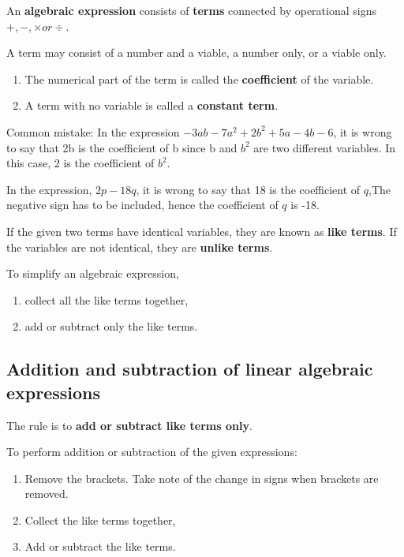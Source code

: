 \documentclass[../main]{subfiles}
\begin{document}
An \textbf{algebraic expression} consists of \textbf{terms} connected by
operational signs \(+, -, \times or \div\). 

A term may consist of a number and a viable, a number only, or a viable only.
\begin{enumerate}
\item  The numerical part of the term is called the \textbf{coefficient} of the
  variable. 
\item  A term with no variable is called a \textbf{constant term}.
  
\end{enumerate}

Common mistake:
In the expression \(-3ab - 7a^2 + 2b^2 + 5a - 4b - 6\), it is wrong to say that
2b is the coefficient of b since b and \(b^2\) are two different variables.
In this case, 2 is the coefficient of \(b^2\).

In the expression, \(2p - 18q\), it is wrong to say that 18 is the coefficient
of \(q\),The negative sign has to be included, hence the coefficient of \(q\) is
-18.

If the given two terms have identical variables, they are known as \textbf{like
  terms}. If the variables are not identical, they are  \textbf{unlike terms}.

To simplify an algebraic expression,
\begin{enumerate}
\item  collect all the like terms together,
 
\item  add or subtract only the like terms. 
\end{enumerate}

\subsection{Addition and subtraction of linear algebraic expressions}
The rule is to \textbf{add or subtract like terms only}.

To perform addition or subtraction of the given expressions:

\begin{enumerate}
\item Remove the brackets. Take note of the change in signs when brackets are
  removed.
 
\item  Collect the like terms together,
 
\item Add or subtract the like terms.
\end{enumerate}
\end{document}
